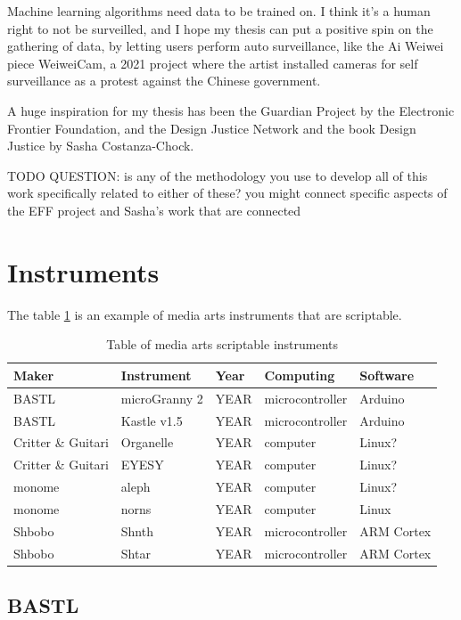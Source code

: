 Machine learning algorithms need data to be trained on. I think it’s a human right to not be surveilled, and I hope my thesis can put a positive spin on the gathering of data, by letting users perform auto surveillance, like the Ai Weiwei piece WeiweiCam, a 2021 project where the artist installed cameras for self surveillance as a protest against the Chinese government.

A huge inspiration for my thesis has been the Guardian Project by the Electronic Frontier Foundation, and the Design Justice Network and the book Design Justice by Sasha Costanza-Chock.

TODO QUESTION: is any of the methodology you use to develop all of this work specifically related to either of these? you might connect specific aspects of the EFF project and Sasha's work that are connected


\section{Instruments}

The table \ref{table:media-arts-scriptable-instruments} is an example of media arts instruments that are scriptable.

\begin{table}[h!]
    \centering
    \begin{tabular}{ | l | l | l | l | l | }
        Maker & Instrument & Year & Computing & Software \\ 
        \hline 
        BASTL & microGranny 2 & YEAR & microcontroller & Arduino \\
        BASTL & Kastle v1.5 & YEAR &microcontroller  & Arduino \\
        Critter \& Guitari & Organelle & YEAR & computer & Linux? \\
        Critter \& Guitari & EYESY & YEAR & computer & Linux? \\
        monome & aleph & YEAR & computer & Linux? \\
        monome & norns & YEAR & computer & Linux \\
        Shbobo & Shnth & YEAR & microcontroller & ARM Cortex \\
        Shbobo & Shtar & YEAR & microcontroller & ARM Cortex 
    \end{tabular}
    \caption{Table of media arts scriptable instruments}
    \label{table:media-arts-scriptable-instruments}
\end{table}


\subsection{BASTL}

